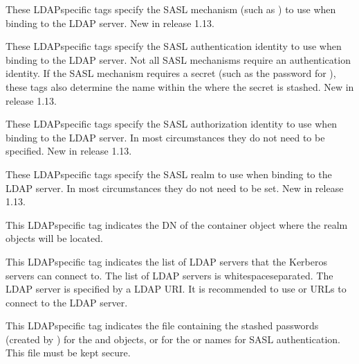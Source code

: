 \documentclass[letterpaper,10pt,english]{sphinxmanual}
\begin{document}
\begin{description}
\sphinxAtStartPar
These LDAP\sphinxhyphen{}specific tags specify the SASL mechanism (such as
) to use when binding to the LDAP server.  New in
release 1.13.

\sphinxAtStartPar
These LDAP\sphinxhyphen{}specific tags specify the SASL authentication identity
to use when binding to the LDAP server.  Not all SASL mechanisms
require an authentication identity.  If the SASL mechanism
requires a secret (such as the password for ), these
tags also determine the name within the
 where the secret is stashed.  New
in release 1.13.

\sphinxAtStartPar
These LDAP\sphinxhyphen{}specific tags specify the SASL authorization identity
to use when binding to the LDAP server.  In most circumstances
they do not need to be specified.  New in release 1.13.

\sphinxAtStartPar
These LDAP\sphinxhyphen{}specific tags specify the SASL realm to use when
binding to the LDAP server.  In most circumstances they do not
need to be set.  New in release 1.13.

\sphinxAtStartPar
This LDAP\sphinxhyphen{}specific tag indicates the DN of the container object
where the realm objects will be located.

\sphinxAtStartPar
This LDAP\sphinxhyphen{}specific tag indicates the list of LDAP servers that the
Kerberos servers can connect to.  The list of LDAP servers is
whitespace\sphinxhyphen{}separated.  The LDAP server is specified by a LDAP URI.
It is recommended to use  or  URLs to connect
to the LDAP server.

\sphinxAtStartPar
This LDAP\sphinxhyphen{}specific tag indicates the file containing the stashed
passwords (created by ) for the
 and  objects, or for the
 or  names
for SASL authentication.  This file must be kept secure.


\end{description}
\end{document}
